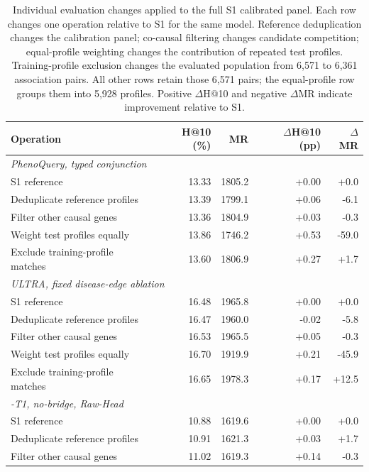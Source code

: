 \begin{table}[tb]
\centering\small
\setlength{\tabcolsep}{4pt}
\caption{Individual evaluation changes applied to the full S1 calibrated panel. Each row changes one operation relative to S1 for the same model. Reference deduplication changes the calibration panel; co-causal filtering changes candidate competition; equal-profile weighting changes the contribution of repeated test profiles. Training-profile exclusion changes the evaluated population from 6,571 to 6,361 association pairs. All other rows retain those 6,571 pairs; the equal-profile row groups them into 5,928 profiles. Positive $\Delta$H@10 and negative $\Delta$MR indicate improvement relative to S1.}
\label{tab:bias_individual_factors}
\begin{tabular}{lrrrr}
\toprule
Operation & H@10 (\%) & MR & $\Delta$H@10 (pp) & $\Delta$MR \\
\midrule
\multicolumn{5}{l}{\emph{PhenoQuery, typed conjunction}} \\
S1 reference & 13.33 & 1805.2 & +0.00 & +0.0 \\
Deduplicate reference profiles & 13.39 & 1799.1 & +0.06 & -6.1 \\
Filter other causal genes & 13.36 & 1804.9 & +0.03 & -0.3 \\
Weight test profiles equally & 13.86 & 1746.2 & +0.53 & -59.0 \\
Exclude training-profile matches & 13.60 & 1806.9 & +0.27 & +1.7 \\
\midrule
\multicolumn{5}{l}{\emph{ULTRA, fixed disease-edge ablation}} \\
S1 reference & 16.48 & 1965.8 & +0.00 & +0.0 \\
Deduplicate reference profiles & 16.47 & 1960.0 & -0.02 & -5.8 \\
Filter other causal genes & 16.53 & 1965.5 & +0.05 & -0.3 \\
Weight test profiles equally & 16.70 & 1919.9 & +0.21 & -45.9 \\
Exclude training-profile matches & 16.65 & 1978.3 & +0.17 & +12.5 \\
\midrule
\multicolumn{5}{l}{\emph{\method{}-T1, no-bridge, Raw-Head}} \\
S1 reference & 10.88 & 1619.6 & +0.00 & +0.0 \\
Deduplicate reference profiles & 10.91 & 1621.3 & +0.03 & +1.7 \\
Filter other causal genes & 11.02 & 1619.3 & +0.14 & -0.3 \\

\end{tabular}
\end{table}
